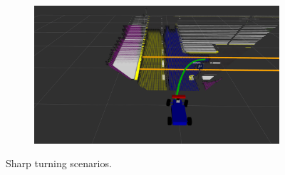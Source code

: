 \begin{figure}[h]
\begin{subfigure}[b]{0.45\linewidth}
  \end{subfigure}
  \begin{subfigure}[b]{0.45\linewidth}
    \includegraphics[width=\linewidth]{figures/experiments/parking-pc.png}
  \end{subfigure}
  \caption[Sharp turning scenarios]{Sharp turning scenarios.}
  \label{figure:sharp-turns}
\end{figure}

